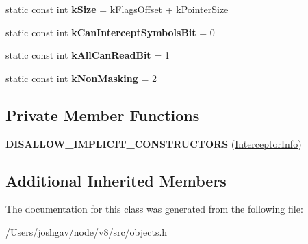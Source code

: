 \begin{DoxyCompactItemize}
\item 
static const int {\bfseries k\+Size} = k\+Flags\+Offset + k\+Pointer\+Size\hypertarget{classv8_1_1internal_1_1_interceptor_info_afd549e28b30209ac6e61b2d6923142c2}{}\label{classv8_1_1internal_1_1_interceptor_info_afd549e28b30209ac6e61b2d6923142c2}

\item 
static const int {\bfseries k\+Can\+Intercept\+Symbols\+Bit} = 0\hypertarget{classv8_1_1internal_1_1_interceptor_info_a09d11fa168dca6f7f0b02e381460ea3b}{}\label{classv8_1_1internal_1_1_interceptor_info_a09d11fa168dca6f7f0b02e381460ea3b}

\item 
static const int {\bfseries k\+All\+Can\+Read\+Bit} = 1\hypertarget{classv8_1_1internal_1_1_interceptor_info_aa4a7b2457a216259d917c96c14a1932b}{}\label{classv8_1_1internal_1_1_interceptor_info_aa4a7b2457a216259d917c96c14a1932b}

\item 
static const int {\bfseries k\+Non\+Masking} = 2\hypertarget{classv8_1_1internal_1_1_interceptor_info_ab3bb54f40178db5bb9c609b68d885ba8}{}\label{classv8_1_1internal_1_1_interceptor_info_ab3bb54f40178db5bb9c609b68d885ba8}

\end{DoxyCompactItemize}
\subsection*{Private Member Functions}
\begin{DoxyCompactItemize}
\item 
{\bfseries D\+I\+S\+A\+L\+L\+O\+W\+\_\+\+I\+M\+P\+L\+I\+C\+I\+T\+\_\+\+C\+O\+N\+S\+T\+R\+U\+C\+T\+O\+RS} (\hyperlink{classv8_1_1internal_1_1_interceptor_info}{Interceptor\+Info})\hypertarget{classv8_1_1internal_1_1_interceptor_info_a9befcd12838a03997631fc05557e632a}{}\label{classv8_1_1internal_1_1_interceptor_info_a9befcd12838a03997631fc05557e632a}

\end{DoxyCompactItemize}
\subsection*{Additional Inherited Members}


The documentation for this class was generated from the following file\+:\begin{DoxyCompactItemize}
\item 
/\+Users/joshgav/node/v8/src/objects.\+h\end{DoxyCompactItemize}
